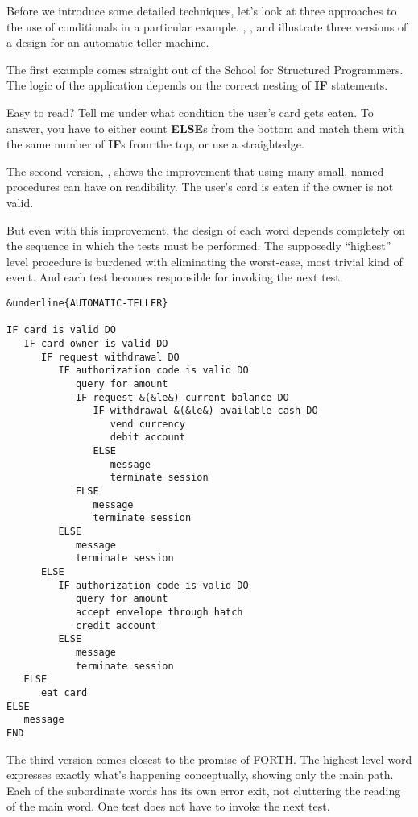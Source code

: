 Before we introduce some detailed techniques, let's look at three approaches
to the use of conditionals in a particular example. ,
, and  illustrate three versions of a design for an
automatic teller machine.

The first example comes straight out of the School for Structured
Programmers. The logic of the application depends on the correct nesting
of \textbf{IF} statements.

Easy to read? Tell me under what condition the user's card gets
eaten. To answer, you have to either count \textbf{ELSE}s from the bottom and
match them with the same number of \textbf{IF}s from the top, or use a
straightedge.

The second version, , shows the improvement that using
many small, named procedures can have on readibility. The user's card is
eaten if the owner is not valid.

But even with this improvement, the design of each word depends
completely on the sequence in which the tests must be performed. The
supposedly ``highest'' level procedure is burdened with eliminating the
worst-case, most trivial kind of event. And each test becomes responsible
for invoking the next test.

\begin{figure*}[tp]
\begin{center}
\small\begin{BVerbatim}[commandchars=\&\{\}]
&underline{AUTOMATIC-TELLER}

IF card is valid DO
   IF card owner is valid DO
      IF request withdrawal DO
         IF authorization code is valid DO
            query for amount
            IF request &(&le&) current balance DO
               IF withdrawal &(&le&) available cash DO
                  vend currency
                  debit account
               ELSE
                  message
                  terminate session
            ELSE
               message
               terminate session
         ELSE
            message
            terminate session
      ELSE
         IF authorization code is valid DO
            query for amount
            accept envelope through hatch
            credit account
         ELSE
            message
            terminate session
   ELSE
      eat card
ELSE
   message
END
\end{BVerbatim}
\end{center}
\end{figure*}
The third version comes closest to the promise of FORTH. The
highest level word expresses exactly what's happening conceptually,
showing only the main path. Each of the subordinate words has its own
error exit, not cluttering the reading of the main word. One test does not
have to invoke the next test.

